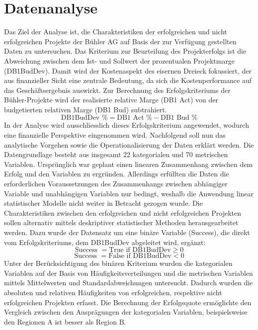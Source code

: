 \section{Datenanalyse}\label{sec:dataana}
Das Ziel der Analyse ist, die Charakteristiken der erfolgreichen und nicht erfolgreichen Projekte der Bühler AG auf Basis der zur Verfügung gestellten Daten zu untersuchen. Das Kriterium zur Beurteilung des Projekterfolgs ist die Abweichung zwischen dem Ist- und Sollwert der prozentualen Projektmarge (DB1BudDev). Damit wird der Kostenaspekt des eisernen Dreieck fokussiert, der aus finanzieller Sicht eine zentrale Bedeutung, da sich die Kostenperformance auf das Geschäftsergebnis auswirkt. Zur Berechnung des Erfolgskriteriums der Bühler-Projekte wird der realisierte relative Marge (DB1 Act) von der budgetierten relativen Marge (DB1 Bud) subtrahiert. 
\begin{equation*}
\text{DB1BudDev \%} = \text{DB1 Act \%} - \text{DB1 Bud \%}
\end{equation*}
In der Analyse wird ausschliesslich dieses Erfolgskriterium angewendet, wodurch eine finanzielle Perspektive eingenommen wird. Nachfolgend soll nun das analytische Vorgehen sowie die Operationalisierung der Daten erklärt werden. 
\newline\newline
Die Datengrundlage besteht aus insgesamt 22 kategorialen und 70 metrischen Variablen. Ursprünglich war geplant einen linearen Zusammenhang zwischen dem Erfolg und den Variablen zu ergründen. Allerdings erfüllten die Daten die erforderlichen Voraussetzungen des Zusammenhangs zwischen abhängiger Variable und unabhängigen Variablen nur bedingt, weshalb die Anwendung linear statistischer Modelle nicht weiter in Betracht gezogen wurde. Die Charakteristiken zwischen den erfolgreichen und nicht erfolgreichen Projekten sollen alternativ mittels deskriptiver statistischer Methoden  herausgearbeitet werden. Dazu wurde der Datensatz um eine binäre Variable (Success), die direkt vom Erfolgskriteriums, dem DB1BudDev abgeleitet wird, ergänzt:
\begin{equation*}
\text{Success } = \text{True if } \text{DB1BudDev}\geq 0
\end{equation*}
\begin{equation*}
\text{Success } = \text{False if } \text{DB1BudDev} < 0
\end{equation*}
Unter der Berücksichtigung des binären Kriterium wurden die kategorialen Variablen auf der Basis von Häufigkeitsverteilungen und die metrischen Variablen mittels Mittelwerten und Standardabweichungen untersucht. Dadurch wurden die absoluten und relativen Häufigkeiten von erfolgreichen, respektive nicht erfolgreichen Projekten erfasst. Die Berechnung der Erfolgsquote ermöglichte den Vergleich zwischen den Ausprägungen der kategorialen Variablen, beispielsweise den Regionen A ist besser als Region B.
